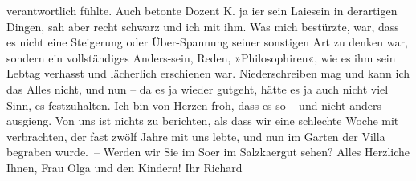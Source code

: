 \begin{ledgroupsized}[t]{13cm}
               verantwortlich fühlte. Auch betonte Dozent K. ja
                  i{\geminationm}er sein Laiesein in derartigen Dingen, sah aber
               recht schwarz {\pb}und ich mit ihm. Was
               mich bestürzte, war, dass es nicht eine Steigerung oder Über-Spannung seiner
               sonstigen Art zu denken war, sondern ein vollständiges Anders-sein, Reden,
               »Philosophiren«, wie es ihm sein Lebtag verhasst und lächerlich erschienen war.
               Niederschreiben mag und kann ich das Alles nicht, und nun – da es ja wieder gutgeht,
               hätte es ja auch nicht viel Sinn, es festzuhalten.\pend
           \pstart
           Ich bin von Herzen froh, dass es so – und nicht anders – ausgieng.\pend
           \pstart
           Von uns ist nichts zu berichten, als dass wir eine schlechte Woche mit \label{KLL02266_AS-1v}\label{KLL02266_AS-1h}
               verbrachten, der fast zwölf Jahre mit uns lebte, und nun im Garten der Villa begraben
               wurde. –\pend
           \pstart
           Werden wir Sie im So{\geminationm}er im Salzka{\geminationm}ergut sehen?\pend
           \pstart
           Alles Herzliche Ihnen, Frau Olga und den Kindern! Ihr\pend
           \pstart \spacefill\mbox{Richard}\pend{}\endnumbering{}\end{ledgroupsized}  \newcommand{\dateiname}{L02266}\newcommand{\titel}{Richard Beer-Hofmann an Arthur Schnitzler, 18. 7. 1917}\newcommand{\editorInnen}{Martin Anton Müller und Gerd-Hermann Susen}
      